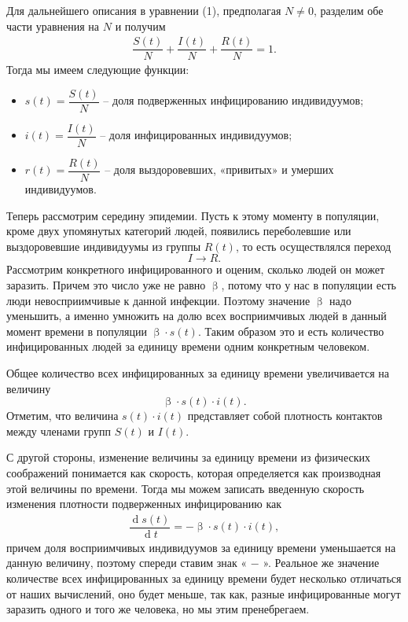 \documentclass[a4paper, 12pt]{extarticle}
\numberwithin{equation}{section}
\renewcommand{\beta}{\upbeta}
\renewcommand{\d}{\operatorname{d}}
\begin{document}
	Для дальнейшего описания в уравнении (1), предполагая $N\ne 0$, разделим обе части уравнения на $N$ и получим 
	\begin{eqnarray}
		\dfrac{S(t)}{N} + \dfrac{I(t)}{N} + \dfrac{R(t)}N = 1.
	\end{eqnarray}
	Тогда мы имеем следующие функции:
	\begin{itemize}
		\item $s(t) = \dfrac {S(t)} N$ -- доля подверженных инфицированию индивидуумов;
		\item $i(t) = \dfrac{I(t)} N$ -- доля инфицированных индивидуумов;
		\item $r(t) = \dfrac{R(t)} N$ -- доля выздоровевших, «привитых» и умерших индивидуумов.
	\end{itemize}
	
	Теперь рассмотрим середину эпидемии. Пусть к этому моменту в популяции, кроме двух упомянутых категорий людей, появились переболевшие или выздоровевшие индивидуумы из группы $R(t)$, то есть осуществлялся переход $$I \to R.$$ Рассмотрим конкретного инфицированного и оценим, сколько людей он может заразить. Причем это число уже не равно $\beta$, потому что у нас в популяции есть люди
	невосприимчивые к данной инфекции. Поэтому значение $\beta$ надо уменьшить, а именно умножить на долю всех восприимчивых людей в данный момент времени в популяции $\beta \cdot s(t)$. Таким образом это и есть количество инфицированных людей за единицу времени одним конкретным человеком. 
	
	Общее количество всех инфицированных за единицу времени увеличивается на
	величину $$\beta \cdot s(t) \cdot i(t).$$
	Отметим, что величина $s(t)\cdot i(t)$
	представляет собой плотность контактов между членами групп
	$S(t)$ и $I(t)$.
	
	С другой стороны, изменение величины за единицу времени из физических соображений понимается как скорость, которая определяется как производная этой величины по времени. Тогда мы можем записать введенную  скорость изменения плотности подверженных инфицированию как 
	\begin{eqnarray}
		\dfrac {\d s(t)}{\d t} = -\beta \cdot s(t) \cdot i(t),
	\end{eqnarray}
	причем доля восприимчивых индивидуумов за единицу времени
	уменьшается на данную величину, поэтому спереди ставим знак « $-$ ».
	Реальное же значение количестве всех инфицированных за единицу времени будет несколько отличаться от наших вычислений, оно будет меньше, так как, разные инфицированные могут заразить одного и того же человека, но мы этим пренебрегаем. 
	
\end{document}
